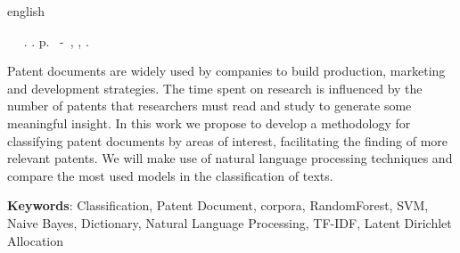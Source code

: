 \begin{resumo}[Abstract]
 \begin{otherlanguage*}{english}
	\begin{flushleft} 
		\setlength{\absparsep}{0pt} %
 		\SingleSpacing 
 		\imprimirautorabr~ ~\textbf{\imprimirtitleabstract}.	\imprimirdata.  \pageref{LastPage}p. 
		\imprimirtipotrabalho~-~\imprimirinstituicao, \imprimirlocal, 	\imprimirdata. 
 	\end{flushleft}
	\OnehalfSpacing 
   Patent documents are widely used by companies to build production, marketing and development strategies. The time spent on research is influenced by the number of patents that researchers must read and study to generate some meaningful insight. In this work we propose to develop a methodology for classifying patent documents by areas of interest, facilitating the finding of more relevant patents. We will make use of natural language processing techniques and compare the most used models in the classification of texts.

   \vspace{\onelineskip}
 
   \noindent 
   \textbf{Keywords}: Classification, Patent Document, corpora, RandomForest, SVM, Naive Bayes, Dictionary, Natural Language Processing, TF-IDF, Latent Dirichlet Allocation
 \end{otherlanguage*}
\end{resumo}
